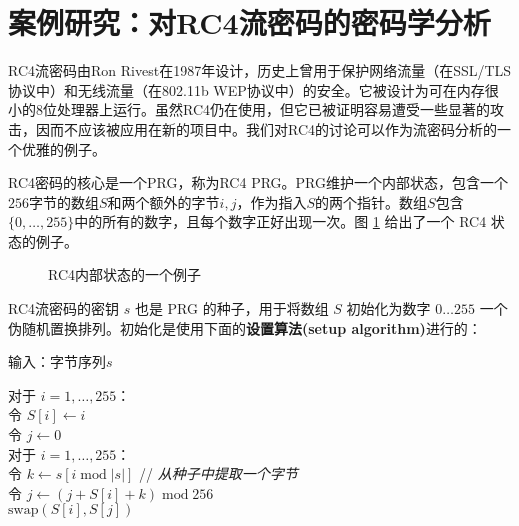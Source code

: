 \section{案例研究：对RC4流密码的密码学分析}

RC4流密码由Ron Rivest在1987年设计，历史上曾用于保护网络流量（在SSL/TLS协议中）和无线流量（在802.11b WEP协议中）的安全。它被设计为可在内存很小的$8$位处理器上运行。虽然RC4仍在使用，但它已被证明容易遭受一些显著的攻击，因而不应该被应用在新的项目中。我们对RC4的讨论可以作为流密码分析的一个优雅的例子。

RC4密码的核心是一个PRG，称为RC4 PRG。PRG维护一个内部状态，包含一个$256$字节的数组$S$和两个额外的字节$i,j$，作为指入$S$的两个指针。数组$S$包含$\{0,\dots,255\}$中的所有的数字，且每个数字正好出现一次。图 \ref{fig:3-12} 给出了一个 RC4 状态的例子。

\begin{figure}
	\centering
	
	\caption{RC4内部状态的一个例子}
	\label{fig:3-12}
\end{figure}

RC4流密码的密钥 $s$ 也是 PRG 的种子，用于将数组 $S$ 初始化为数字 $0 \dots 255$ 一个伪随机置换排列。初始化是使用下面的\textbf{设置算法(setup algorithm)}进行的：

\vspace*{5pt}

\hspace*{5pt} 输入：字节序列$s$

\vspace{3pt}

\hspace*{5pt} 对于 $i=1,\dots,255$：\\
\hspace*{50pt} 令 $S[i]\leftarrow i$ \\
\hspace*{26pt} 令 $j\leftarrow0$\\
\hspace*{26pt} 对于 $i=1,\dots,255$：\\
\hspace*{50pt} 令 $k\leftarrow s[i\;\mathrm{mod}\;|s|]$ \quad\quad // \emph{从种子中提取一个字节}\\
\hspace*{50pt} 令 $j\leftarrow(j+S[i]+k)\;\mathrm{mod}\;256$\\
\hspace*{50pt} $\mathrm{swap}(S[i],S[j])$

\vspace*{5pt}

